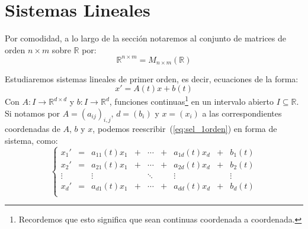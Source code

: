 \newpage
\chapter{Sistemas Lineales}

\begin{notacion}
    Por comodidad, a lo largo de la sección notaremos al conjunto de matrices de orden $n\times m$ sobre $\mathbb{R}$ por:
    \begin{equation*}
        \mathbb{R}^{n\times m} = M_{n\times m}(\mathbb{R})
    \end{equation*}
\end{notacion}

\noindent
Estudiaremos sistemas lineales de primer orden, es decir, ecuaciones de la forma:
\begin{equation}\label{eq:sel_1orden}
    x' = A(t) x + b(t)
\end{equation}
Con $A:I\rightarrow\mathbb{R}^{d\times d}$ y $b:I\rightarrow\mathbb{R}^d$, funciones continuas\footnote{Recordemos que esto significa que sean continuas coordenada a coordenada.} en un intervalo abierto $I\subseteq \mathbb{R}$. Si notamos por $A = {(a_{ij})}_{i,j}$, $d = (b_i)$ y $x = (x_i)$ a las correspondientes coordenadas de $A$, $b$ y $x$, podemos reescribir~(\ref{eq:sel_1orden}) en forma de sistema, como:
\begin{equation}\label{eq:sistema_1orden}
    \left\{\begin{array}{ccccccccc}
            x_1' & = & a_{11}(t)x_1 & + & \cdots & + & a_{1d}(t)x_d & + & b_1(t) \\
            x_2' & = & a_{21}(t)x_1 & + & \cdots & + & a_{2d}(t)x_d & + & b_2(t) \\
            \vdots & & \vdots & & \ddots & & \vdots & & \vdots \\
            x_d' & = & a_{d1}(t)x_1 & + & \cdots & + & a_{dd}(t)x_d & + & b_d(t) \\
    \end{array}\right.
\end{equation}

